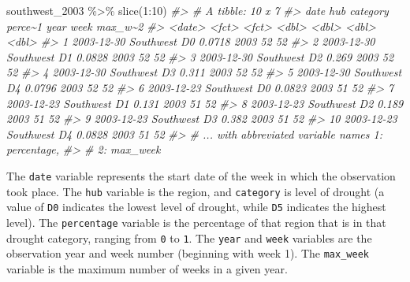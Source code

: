 \documentclass[
]{book}
\newenvironment{Shaded}{\begin{snugshade}}{\end{snugshade}}
\newcommand{\CommentTok}[1]{\textcolor[rgb]{0.56,0.35,0.01}{\textit{#1}}}
\newcommand{\DecValTok}[1]{\textcolor[rgb]{0.00,0.00,0.81}{#1}}
\newcommand{\FunctionTok}[1]{\textcolor[rgb]{0.00,0.00,0.00}{#1}}
\newcommand{\NormalTok}[1]{#1}
\newcommand{\SpecialCharTok}[1]{\textcolor[rgb]{0.00,0.00,0.00}{#1}}
\begin{document}
\begin{Shaded}
\begin{Highlighting}[]
\NormalTok{southwest\_2003 }\SpecialCharTok{\%\textgreater{}\%}
  \FunctionTok{slice}\NormalTok{(}\DecValTok{1}\SpecialCharTok{:}\DecValTok{10}\NormalTok{)}
\CommentTok{\#\textgreater{} \# A tibble: 10 x 7}
\CommentTok{\#\textgreater{}    date       hub       category perce\textasciitilde{}1  year  week max\_w\textasciitilde{}2}
\CommentTok{\#\textgreater{}    \textless{}date\textgreater{}     \textless{}fct\textgreater{}     \textless{}fct\textgreater{}      \textless{}dbl\textgreater{} \textless{}dbl\textgreater{} \textless{}dbl\textgreater{}   \textless{}dbl\textgreater{}}
\CommentTok{\#\textgreater{}  1 2003{-}12{-}30 Southwest D0        0.0718  2003    52      52}
\CommentTok{\#\textgreater{}  2 2003{-}12{-}30 Southwest D1        0.0828  2003    52      52}
\CommentTok{\#\textgreater{}  3 2003{-}12{-}30 Southwest D2        0.269   2003    52      52}
\CommentTok{\#\textgreater{}  4 2003{-}12{-}30 Southwest D3        0.311   2003    52      52}
\CommentTok{\#\textgreater{}  5 2003{-}12{-}30 Southwest D4        0.0796  2003    52      52}
\CommentTok{\#\textgreater{}  6 2003{-}12{-}23 Southwest D0        0.0823  2003    51      52}
\CommentTok{\#\textgreater{}  7 2003{-}12{-}23 Southwest D1        0.131   2003    51      52}
\CommentTok{\#\textgreater{}  8 2003{-}12{-}23 Southwest D2        0.189   2003    51      52}
\CommentTok{\#\textgreater{}  9 2003{-}12{-}23 Southwest D3        0.382   2003    51      52}
\CommentTok{\#\textgreater{} 10 2003{-}12{-}23 Southwest D4        0.0828  2003    51      52}
\CommentTok{\#\textgreater{} \# ... with abbreviated variable names 1: percentage,}
\CommentTok{\#\textgreater{} \#   2: max\_week}
\end{Highlighting}
\end{Shaded}

The \texttt{date} variable represents the start date of the week in which the observation took place. The \texttt{hub} variable is the region, and \texttt{category} is level of drought (a value of \texttt{D0} indicates the lowest level of drought, while \texttt{D5} indicates the highest level). The \texttt{percentage} variable is the percentage of that region that is in that drought category, ranging from \texttt{0} to \texttt{1}. The \texttt{year} and \texttt{week} variables are the observation year and week number (beginning with week 1). The \texttt{max\_week} variable is the maximum number of weeks in a given year.
\end{document}
